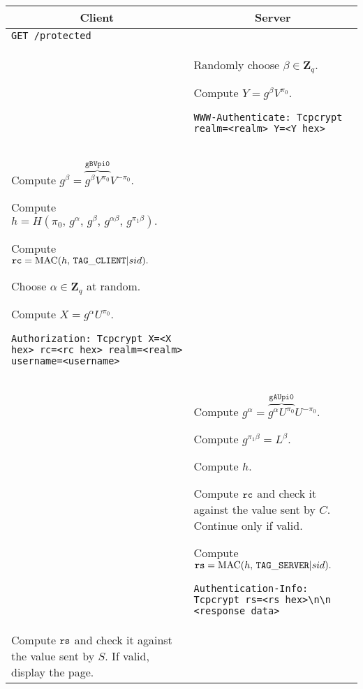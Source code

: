 \documentclass[12pt]{article}
\begin{document}
\begin{tabular}{p{9cm} | p{9cm}}
\multicolumn{1}{c}{\bf Client} & \multicolumn{1}{c}{\bf Server} \\
\hline
{\tt GET /protected} &\\

& Randomly choose $\beta \in \mathbf{Z}_q.$

Compute $Y=g^\beta V^{\pi_0}.$

{\tt WWW-Authenticate: Tcpcrypt realm=<realm> Y=<Y hex>} \\

Compute $g^\beta = \overbrace{g^\beta V^{\pi_0}}^{\mathtt{gBVpi0}} V^{-\pi_0}.$

Compute $h = H(\pi_0,\, g^\alpha,\, g^\beta,\, g^{\alpha \beta},\, g^{\pi_1 \beta}).$

Compute ${\tt rc} = \operatorname{MAC}(h,\, {\tt TAG\_CLIENT} | sid).$

Choose $\alpha \in \mathbf{Z}_q$ at random.

Compute $X=g^\alpha U^{\pi_0}.$

{\tt Authorization: Tcpcrypt X=<X hex> rc=<rc hex> realm=<realm> username=<username>} & \\

& Compute $g^\alpha = \overbrace{g^\alpha U^{\pi_0}}^{\mathtt{gAUpi0}} U^{-\pi_0}.$

Compute $g^{\pi_1 \beta} = L^\beta.$

Compute $h$.

Compute ${\tt rc}$ and check it against the value sent by $C.$ Continue only if valid.

Compute ${\tt rs} = \operatorname{MAC}(h,\, {\tt TAG\_SERVER} | sid).$

{\tt Authentication-Info: Tcpcrypt rs=<rs hex>\textbackslash n\textbackslash n <response data>} \\

Compute ${\tt rs}$ and check it against the value sent by $S.$ If valid, display the page.
\end{tabular}
\end{document}
